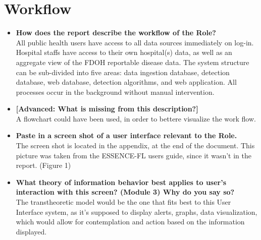 \documentclass{article}
\begin{document}
\section{Workflow}
\begin{itemize}
\item{\textbf{How does the report describe the workflow of the Role?}}\\
All public health users have access to all data sources immediately on log-in. Hospital
staffs have access to their own hospital(s) data, as well as an aggregate view of the FDOH
reportable disease data. The system structure can be sub-divided into five areas: data ingestion database, detection database, web database, detection algorithms, and web application. All processes occur in the background without manual intervention.

\item{\textbf{[Advanced: What is missing from this description?]}}\\
A flowchart could have been used, in order to bettere visualize the work flow.

\item{\textbf{Paste in a screen shot of a user interface relevant to the Role.}}\\
The screen shot is located in the appendix, at the end of the document. This picture was taken from the ESSENCE-FL users guide, since it wasn't in the report. (Figure 1)

\item{\textbf{What theory of information behavior best applies to user’s interaction with this screen? (Module 3) Why do you say so?}}\\
The transtheoretic model would be the one that fits best to this User Interface system, as it's supposed to display alerts, graphs, data visualization, which would allow for contemplation and action based on the information displayed.
\end{itemize}
\pagebreak
\end{document}
